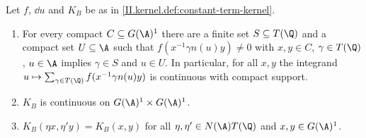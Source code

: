 Let $f$, $\dd u$ and $K_B$ be as in \cref{II.kernel.def:constant-term-kernel}.
\begin{enumerate}
  \item[(a)] For every compact $C\subseteq G(\A)^1$ there are a finite set $S\subseteq T(\Q)$ and a compact set $U\subseteq\A$ such that
  $f(x^{-1}\gamma n(u)y)\neq0$ with $x,y\in C$, $\gamma\in T(\Q)$, $u\in\A$ implies $\gamma\in S$ and $u\in U$. In particular, for all $x,y$ the integrand
  $u\mapsto\sum_{\gamma\in T(\Q)}f(x^{-1}\gamma n(u)y)$ is continuous with compact support.
  \item[(b)] $K_B$ is continuous on $G(\A)^1\times G(\A)^1$.
  \item[(c)] $K_B(\eta x,\eta'y)=K_B(x,y)$ for all $\eta,\eta'\in N(\A)T(\Q)$ and $x,y\in G(\A)^1$.
\end{enumerate}
